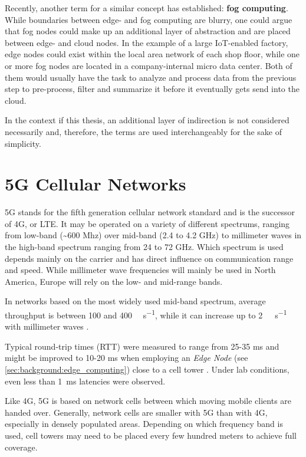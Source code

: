 Recently, another term for a similar concept has established: \textbf{fog computing}. While boundaries between edge- and fog computing are blurry, one could argue that fog nodes could make up an additional layer of abstraction and are placed between edge- and cloud nodes. In the example of a large IoT-enabled factory, edge nodes could exist within the local area network of each shop floor, while one or more fog nodes are located in a company-internal micro data center. Both of them would usually have the task to analyze and process data from the previous step to pre-process, filter and summarize it before it eventually gets send into the cloud.

In the context if this thesis, an additional layer of indirection is not considered necessarily and, therefore, the terms are used interchangeably for the sake of simplicity. 

\section{5G Cellular Networks}
\label{sec:background:5g}
5G stands for the fifth generation cellular network standard and is the successor of 4G, or LTE. It may be operated on a variety of different spectrums, ranging from low-band (\textasciitilde 600 Mhz) over mid-band (2.4 to 4.2 \si{\giga\hertz}) to millimeter waves in the high-band spectrum ranging from 24 to 72 \si{\giga\hertz}. Which spectrum is used depends mainly on the carrier and has direct influence on communication range and speed. While millimeter wave frequencies will mainly be used in North America, Europe will rely on the low- and mid-range bands.

In networks based on the most widely used mid-band spectrum, average throughput is between 100 and 400 \si{\mega\bit\per\second}, while it can increase up to \SI{2}{\giga\bit\per\second} with millimeter waves \cite{wiki:5g}.

Typical round-trip times (RTT) were measured to range from 25-35 \si{\milli\second} and might be improved to 10-20 \si{\milli\second} when employing an \textit{Edge Node} (see \cref{sec:background:edge_computing}) close to a cell tower \cite{wiki:5g}. Under lab conditions, even less than \SI{1}{\milli\second} latencies were observed.

Like 4G, 5G is based on network cells between which moving mobile clients are handed over. Generally, network cells are smaller with 5G than with 4G, especially in densely populated areas. Depending on which frequency band is used, cell towers may need to be placed every few hundred meters to achieve full coverage.

